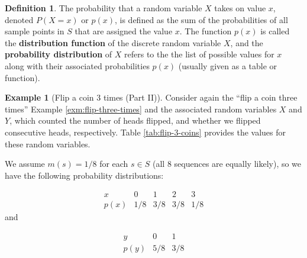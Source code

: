 \documentclass[
]{book}
\theoremstyle{definition}
\newtheorem{definition}{Definition}[chapter]
\theoremstyle{definition}
\newtheorem{example}{Example}[chapter]
\theoremstyle{definition}
\theoremstyle{definition}
\theoremstyle{remark}
\begin{document}
\begin{definition}
\protect\hypertarget{def:prob-distribution-discete-rv}{}\label{def:prob-distribution-discete-rv}The probability that a random variable \(X\) takes on value \(x\), denoted \(P(X = x)\) or \(p(x)\), is defined as the sum of the probabilities of all sample points in \(S\) that are assigned the value \(x\). The function \(p(x)\) is called the \textbf{distribution function} of the discrete random variable \(X\), and the \textbf{probability distribution} of \(X\) refers to the the list of possible values for \(x\) along with their associated probabilities \(p(x)\) (usually given as a table or function).
\end{definition}

\begin{example}[Flip a coin 3 times (Part II)]
\protect\hypertarget{exm:flip-three-times-probs}{}\label{exm:flip-three-times-probs}Consider again the ``flip a coin three times'' Example \ref{exm:flip-three-times} and the associated random variables \(X\) and \(Y\), which counted the number of heads flipped, and whether we flipped consecutive heads, respectively. Table \ref{tab:flip-3-coins} provides the values for these random variables.

We assume \(m(s) = 1/8\) for each \(s \in S\) (all 8 sequences are equally likely), so we have the following probability distributions:

\[
\begin{array}{c|c|c|c|c}
x & 0 & 1 & 2 & 3 \\ \hline
p(x) & 1/8 & 3/8 & 3/8 & 1/8 
\end{array}
\]
and

\[
\begin{array}{c|c|c}
y & 0 & 1  \\ \hline
p(y) & 5/8 & 3/8  
\end{array}
\]
\end{example}
\end{document}
